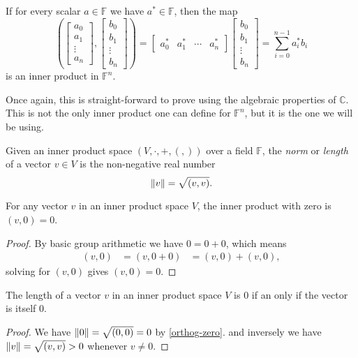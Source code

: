 \begin{prop}
	If for every scalar $a \in \mathbb{F}$ we have $a^* \in \mathbb{F}$, then the map
\[
\left(
\left[\begin{matrix} a_0\\a_1\\\vdots\\a_n\end{matrix}\right]
,
\left[\begin{matrix} b_0\\b_1\\\vdots\\b_n\end{matrix}\right]
\right)
=
\left[\begin{matrix} a_0^*&a_1^*&\cdots&a_n^*\end{matrix}\right]
\left[\begin{matrix} b_0\\b_1\\\vdots\\b_n\end{matrix}\right]
= \sum_{i=0}^{n-1} a_i^*b_i
\]
is an inner product in $\mathbb{F}^n$.
\end{prop}
Once again, this is straight-forward to prove using the algebraic properties of $\mathbb{C}$. This is not the only inner product one can define for $\mathbb{F}^n$, but it is the one we will be using.

\begin{define}[Norm]
	Given an inner product space $(V, \cdot, + , (,))$ over a field $\mathbb{F}$, the \emph{norm} or \emph{length} of a vector $v \in V$ is the non-negative real number
	\[\left\Vert v \right\Vert = \sqrt{(v,v)}.\]
\end{define}

\begin{prop}\label{orthog-zero}
	For any vector $v$ in an inner product space $V$, the inner product with zero is $(v, 0) = 0$.
\end{prop}
\begin{proof}
	By basic group arithmetic we have $0 = 0 + 0$, which means
	\begin{align*}
		(v, 0)
		&= (v, 0+0)
		&= (v,0)+(v,0),
	\end{align*}
	solving for $(v,0)$ gives $(v,0) = 0$.
\end{proof}

\begin{prop}\label{norm-zero}
	 The length of a vector $v$ in an inner product space $V$ is 0 if an only if the vector is itself 0.
\end{prop}
\begin{proof}
	We have $\left\Vert 0 \right\Vert = \sqrt{(0,0)} = 0$ by \autoref{orthog-zero}. and inversely we have $\left\Vert v \right\Vert = \sqrt{(v,v)} > 0$ whenever $v \neq 0$.
\end{proof}

